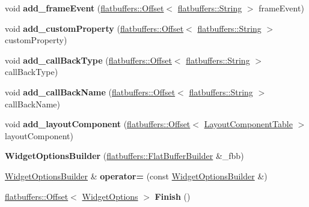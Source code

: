 \begin{DoxyCompactItemize}
void {\bfseries add\+\_\+frame\+Event} (\hyperlink{structflatbuffers_1_1Offset}{flatbuffers\+::\+Offset}$<$ \hyperlink{structflatbuffers_1_1String}{flatbuffers\+::\+String} $>$ frame\+Event)
\item 
\mbox{\label{structflatbuffers_1_1WidgetOptionsBuilder_a74ca046ab67b512f00f9e9a4156d7a51}} 
void {\bfseries add\+\_\+custom\+Property} (\hyperlink{structflatbuffers_1_1Offset}{flatbuffers\+::\+Offset}$<$ \hyperlink{structflatbuffers_1_1String}{flatbuffers\+::\+String} $>$ custom\+Property)
\item 
\mbox{\label{structflatbuffers_1_1WidgetOptionsBuilder_a44c4def4d6effc6d0ed2237789aac637}} 
void {\bfseries add\+\_\+call\+Back\+Type} (\hyperlink{structflatbuffers_1_1Offset}{flatbuffers\+::\+Offset}$<$ \hyperlink{structflatbuffers_1_1String}{flatbuffers\+::\+String} $>$ call\+Back\+Type)
\item 
\mbox{\label{structflatbuffers_1_1WidgetOptionsBuilder_ad4267727fe9bd71e95a98a27d0ae4d79}} 
void {\bfseries add\+\_\+call\+Back\+Name} (\hyperlink{structflatbuffers_1_1Offset}{flatbuffers\+::\+Offset}$<$ \hyperlink{structflatbuffers_1_1String}{flatbuffers\+::\+String} $>$ call\+Back\+Name)
\item 
\mbox{\label{structflatbuffers_1_1WidgetOptionsBuilder_a4ff452be8f7f3fe9df5d954a98b02231}} 
void {\bfseries add\+\_\+layout\+Component} (\hyperlink{structflatbuffers_1_1Offset}{flatbuffers\+::\+Offset}$<$ \hyperlink{structflatbuffers_1_1LayoutComponentTable}{Layout\+Component\+Table} $>$ layout\+Component)
\item 
\mbox{\label{structflatbuffers_1_1WidgetOptionsBuilder_a76069e10935edf0ef3cdec035a66b959}} 
{\bfseries Widget\+Options\+Builder} (\hyperlink{classflatbuffers_1_1FlatBufferBuilder}{flatbuffers\+::\+Flat\+Buffer\+Builder} \&\+\_\+fbb)
\item 
\mbox{\label{structflatbuffers_1_1WidgetOptionsBuilder_aab430614ffa5fcb90274421c5795c5a2}} 
\hyperlink{structflatbuffers_1_1WidgetOptionsBuilder}{Widget\+Options\+Builder} \& {\bfseries operator=} (const \hyperlink{structflatbuffers_1_1WidgetOptionsBuilder}{Widget\+Options\+Builder} \&)
\item 
\mbox{\label{structflatbuffers_1_1WidgetOptionsBuilder_ad5d4dd093853438da98341a8f47706d8}} 
\hyperlink{structflatbuffers_1_1Offset}{flatbuffers\+::\+Offset}$<$ \hyperlink{structflatbuffers_1_1WidgetOptions}{Widget\+Options} $>$ {\bfseries Finish} ()
\end{DoxyCompactItemize}
